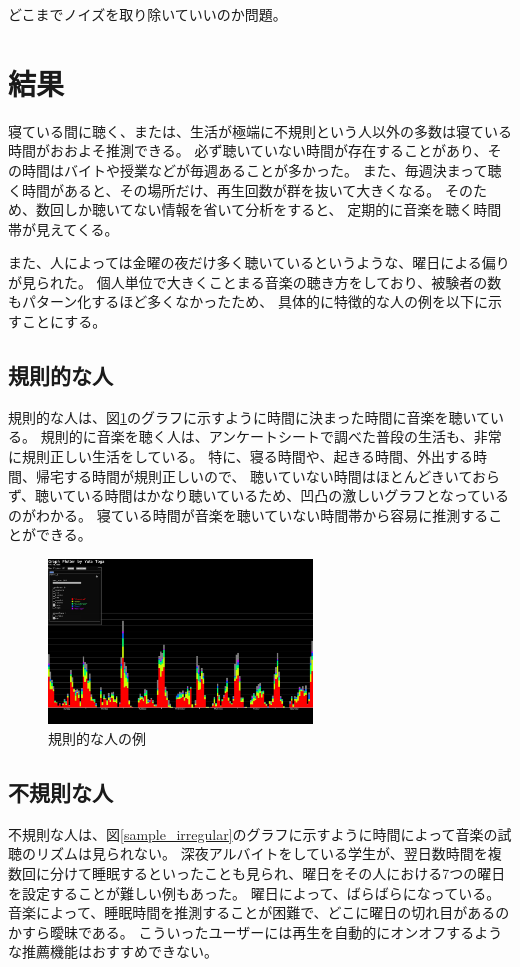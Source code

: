 \documentclass[11pt, twocolumn]{jsarticle}
\begin{document}
	
どこまでノイズを取り除いていいのか問題。



\section{結果}

寝ている間に聴く、または、生活が極端に不規則という人以外の多数は寝ている時間がおおよそ推測できる。
必ず聴いていない時間が存在することがあり、その時間はバイトや授業などが毎週あることが多かった。
また、毎週決まって聴く時間があると、その場所だけ、再生回数が群を抜いて大きくなる。
そのため、数回しか聴いてない情報を省いて分析をすると、
定期的に音楽を聴く時間帯が見えてくる。

また、人によっては金曜の夜だけ多く聴いているというような、曜日による偏りが見られた。
個人単位で大きくことまる音楽の聴き方をしており、被験者の数もパターン化するほど多くなかったため、
具体的に特徴的な人の例を以下に示すことにする。
\subsection{規則的な人}
規則的な人は、図\ref{sample_regular}のグラフに示すように時間に決まった時間に音楽を聴いている。
規則的に音楽を聴く人は、アンケートシートで調べた普段の生活も、非常に規則正しい生活をしている。
特に、寝る時間や、起きる時間、外出する時間、帰宅する時間が規則正しいので、
聴いていない時間はほとんどきいておらず、聴いている時間はかなり聴いているため、凹凸の激しいグラフとなっているのがわかる。
寝ている時間が音楽を聴いていない時間帯から容易に推測することができる。

\begin{figure}[h]
\begin{center}
\includegraphics[width=7cm]{sample_regular.jpg}
\caption{規則的な人の例}
\label{sample_regular}
\end{center}
\end{figure}



\subsection{不規則な人}
不規則な人は、図\ref{sample_irregular}のグラフに示すように時間によって音楽の試聴のリズムは見られない。
深夜アルバイトをしている学生が、翌日数時間を複数回に分けて睡眠するといったことも見られ、曜日をその人における7つの曜日を設定することが難しい例もあった。
曜日によって、ばらばらになっている。
音楽によって、睡眠時間を推測することが困難で、どこに曜日の切れ目があるのかすら曖昧である。
こういったユーザーには再生を自動的にオンオフするような推薦機能はおすすめできない。
\end{document}
